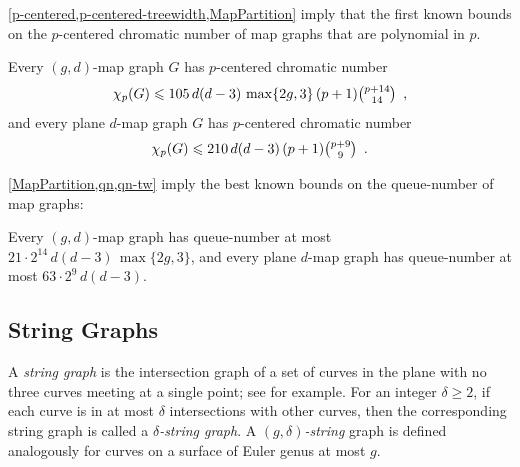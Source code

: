 \documentclass{patmorin}
\newcommand{\note}[2]{{\color{red}[#1:~#2]}}
\DeclareMathOperator{\qn}{qn}
\renewcommand{\le}{\leqslant}
\renewcommand{\geq}{\geqslant}
\begin{document}
\cref{p-centered,p-centered-treewidth,MapPartition} imply that the first known bounds on the $p$-centered chromatic number of map graphs that are polynomial in $p$.

\begin{cor}
Every $(g,d)$-map graph $G$ has $p$-centered chromatic number  
\[ \chi_p(G)\le 105\, d(d-3)\, \max\{2g,3\}\, (p+1) \tbinom{p+14}{14}\enspace, \]
and every plane $d$-map graph $G$ has $p$-centered chromatic number  
\[ \chi_p(G)\le 210\,d(d-3)\, (p+1) \tbinom{p+9}{9}\enspace. \]
\end{cor}

\cref{MapPartition,qn,qn-tw} imply the best known bounds on the queue-number of map graphs:

\begin{cor}
Every $(g,d)$-map graph has queue-number at most $ 21\cdot 2^{14} \, d(d-3)\, \max\{2g,3\} $, 
and every plane $d$-map graph  has queue-number at most 
$ 63 \cdot 2^9\, d(d-3)$. 
\end{cor}






\subsection{String Graphs}

A \emph{string graph} is the intersection graph of a set of curves in the plane with no three curves meeting at a single point; see  \cite{PachToth-DCG02,FP10,FP14} for example. For an integer $\delta\geq 2$, if each curve is in at most $\delta$ intersections with other curves, then the corresponding string graph is called a \emph{$\delta$-string graph}. A \emph{$(g,\delta)$-string} graph is defined analogously for curves on a surface of Euler genus at most $g$.  
\end{document}
